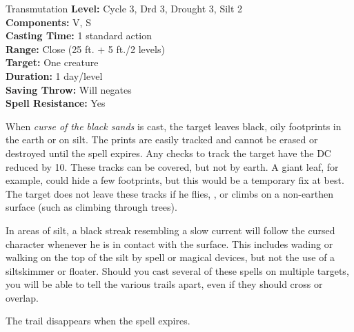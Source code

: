 {Transmutation}
{
	\textbf{Level:}
	Cycle 3, Drd 3, Drought 3, Silt 2\\
	\textbf{Components:}
	V, S\\
	\textbf{Casting Time:}
	1 standard action\\
	\textbf{Range:}
	Close (25 ft. + 5 ft./2 levels)\\
	\textbf{Target:}
	One creature\\
	\textbf{Duration:}
	1 day/level\\
	\textbf{Saving Throw:}
	Will negates\\
	\textbf{Spell Resistance:}
	Yes\\
}
{
	When \emph{curse of the black sands} is cast, the target leaves black, oily footprints in the earth or on silt. The prints are easily tracked and cannot be erased or destroyed until the spell expires. Any  checks to track the target have the DC reduced by 10. These tracks can be covered, but not by earth. A giant leaf, for example, could hide a few footprints, but this would be a temporary fix at best. The target does not leave these tracks if he flies, , or climbs on a non-earthen surface (such as climbing through trees).

	In areas of silt, a black streak resembling a slow current will follow the cursed character whenever he is in contact with the surface. This includes wading or walking on the top of the silt by spell or magical devices, but not the use of a siltskimmer or floater. Should you cast several of these spells on multiple targets, you will be able to tell the various trails apart, even if they should cross or overlap.

	The trail disappears when the spell expires.
}
